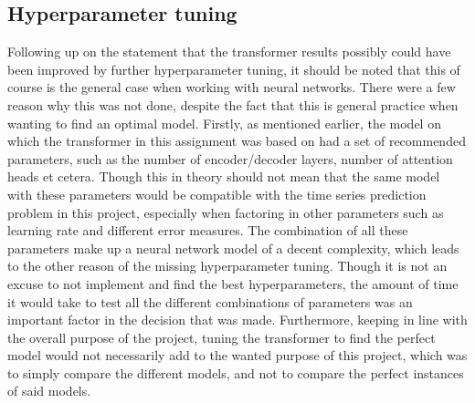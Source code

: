 \documentclass[main.tex]{subfiles}
\begin{document}
\subsection{Hyperparameter tuning}
Following up on the statement that the transformer results possibly could have been improved by further hyperparameter tuning, it should be noted that this of course is the general case when working with neural networks. There were a few reason why this was not done, despite the fact that this is general practice when wanting to find an optimal model. Firstly, as mentioned earlier, the model on which the transformer in this assignment was based on had a set of recommended parameters, such as the number of encoder/decoder layers, number of attention heads et cetera. Though this in theory should not mean that the same model with these parameters would be compatible with the time series prediction problem in this project, especially when factoring in other parameters such as learning rate and different error measures. The combination of all these parameters make up a neural network model of a decent complexity, which leads to the other reason of the missing hyperparameter tuning. Though it is not an excuse to not implement and find the best hyperparameters, the amount of time it would take to test all the different combinations of parameters was an important factor in the decision that was made. Furthermore, keeping in line with the overall purpose of the project, tuning the transformer to find the perfect model would not necessarily add to the wanted purpose of this project, which was to simply compare the different models, and not to compare the perfect instances of said models.
\end{document}
